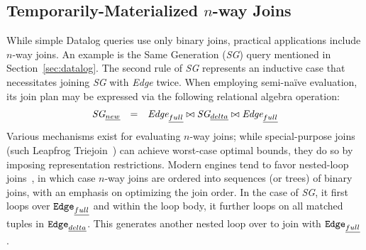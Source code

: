 \documentclass[nonacm,sigplan]{acmart}
\begin{document}
\subsection{Temporarily-Materialized $n$-way Joins}
\label{sec:impl-k-way}
While simple Datalog queries use only binary joins, practical applications include $n$-way joins. An example is the Same Generation (\emph{SG}) query  mentioned in Section~\ref{sec:datalog}. 
The second rule of \textit{SG} represents an inductive case that necessitates joining \emph{SG} with \emph{Edge} twice. When employing semi-na\"ive evaluation, its join plan may be expressed via the following relational algebra operation:
\begin{displaymath}
\begin{array}{lcl}
        \textit{SG}_{\emph{new}} & = & \textit{Edge}_{\emph{full}} \bowtie \textit{SG}_{\emph{delta}} \bowtie \textit{Edge}_{\emph{full}} 
    \end{array}
\end{displaymath}
Various mechanisms exist for evaluating $n$-way joins; while special-purpose joins (such Leapfrog Triejoin~\cite{veldhuizen2014leapfrog}) can achieve worst-case optimal bounds, they do so by imposing representation restrictions. Modern engines tend to favor nested-loop joins~\cite{jordan2016souffle}, in which case $n$-way joins are ordered into sequences (or trees) of binary joins, with an emphasis on optimizing the join order\cite{zhao2024evaluating}. In the case of \emph{SG},  it first loops over  $\texttt{Edge}_{\emph{full}}$ and within the loop body, it further loops on all matched  tuples in $\texttt{Edge}_{\emph{delta}}$. This generates another nested loop over to join with $\texttt{Edge}_{\emph{full}}$.
\end{document}

